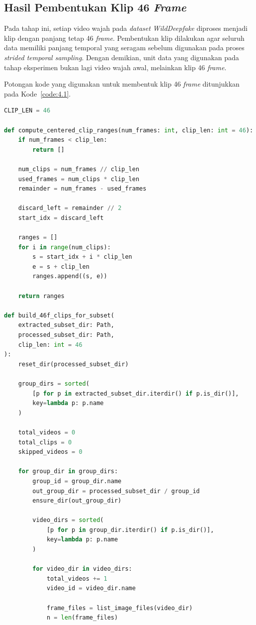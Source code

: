 \subsection{Hasil Pembentukan Klip 46 \textit{Frame}} \label{IV.Klip46}
Pada tahap ini, setiap video wajah pada \textit{dataset} \textit{WildDeepfake} diproses menjadi klip dengan panjang tetap 46 \textit{frame}. Pembentukan klip dilakukan agar seluruh data memiliki panjang temporal yang seragam sebelum digunakan pada proses \textit{strided temporal sampling}. Dengan demikian, unit data yang digunakan pada tahap eksperimen bukan lagi video wajah awal, melainkan klip 46 \textit{frame}.

Potongan kode yang digunakan untuk membentuk klip 46 \textit{frame} ditunjukkan pada Kode~\ref{code:4.1}.

\begin{lstlisting}[language=Python, caption={Pembentukan Klip 46 \textit{Frame}}, label={code:4.1}]
CLIP_LEN = 46

def compute_centered_clip_ranges(num_frames: int, clip_len: int = 46):
	if num_frames < clip_len:
		return []

	num_clips = num_frames // clip_len
	used_frames = num_clips * clip_len
	remainder = num_frames - used_frames

	discard_left = remainder // 2
	start_idx = discard_left

	ranges = []
	for i in range(num_clips):
		s = start_idx + i * clip_len
		e = s + clip_len
		ranges.append((s, e))

	return ranges

def build_46f_clips_for_subset(
	extracted_subset_dir: Path,
	processed_subset_dir: Path,
	clip_len: int = 46
):
	reset_dir(processed_subset_dir)

	group_dirs = sorted(
		[p for p in extracted_subset_dir.iterdir() if p.is_dir()],
		key=lambda p: p.name
	)

	total_videos = 0
	total_clips = 0
	skipped_videos = 0

	for group_dir in group_dirs:
		group_id = group_dir.name
		out_group_dir = processed_subset_dir / group_id
		ensure_dir(out_group_dir)

		video_dirs = sorted(
			[p for p in group_dir.iterdir() if p.is_dir()],
			key=lambda p: p.name
		)

		for video_dir in video_dirs:
			total_videos += 1
			video_id = video_dir.name

			frame_files = list_image_files(video_dir)
			n = len(frame_files)


\end{lstlisting}
